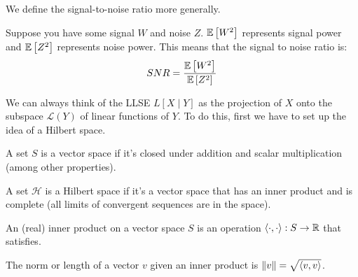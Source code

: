 We define the signal-to-noise ratio more generally.

\begin{definition}
    Suppose you have some signal $W$ and noise $Z$. $\mathbb{E}\left[ W^2 \right]$ represents signal power and $\mathbb{E}\left[ Z^2 \right]$ represents noise power.
    This means that the signal to noise ratio is:
    \[ SNR = \frac{\mathbb{E}\left[ W^2 \right]}{\mathbb{E}\left[ Z^2 \right]} \]
\end{definition}

We can always think of the LLSE $L[X \mid Y]$ as the projection of $X$ onto the subspace $\mathcal{L}(Y)$ of linear functions of $Y$.
To do this, first we have to set up the idea of a Hilbert space.

\begin{definition}
    A set $S$ is a vector space if it's closed under addition and scalar multiplication (among other properties).
\end{definition}

\begin{definition}
    A set $\mathcal{H}$ is a Hilbert space if it's a vector space that has an inner product and is complete (all limits of convergent sequences are in the space).
\end{definition}

\begin{definition}
    An (real) inner product on a vector space $S$ is an operation $\langle \cdot, \cdot \rangle : S \to \operatorname{\mathbb{R}}$
    that satisfies.
\end{definition}

\begin{definition}[Norm]
    The norm or length of a vector $v$ given an inner product is $\norm{v} = \sqrt{\langle v, v \rangle}$.
\end{definition}